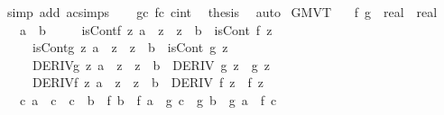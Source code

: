 \begin{isabellebody}
\ {\isacharparenleft}{\kern0pt}simp\ add{\isacharcolon}{\kern0pt}\ ac{\isacharunderscore}{\kern0pt}simps{\isacharparenright}{\kern0pt}\isanewline
\ \ \isamarkupfalse%
\ g{\isacharprime}{\kern0pt}c\ f{\isacharprime}{\kern0pt}c\ cint\ \isamarkupfalse%
\ {\isacharquery}{\kern0pt}thesis\ \isamarkupfalse%
\ auto\isanewline
{}\isamarkupfalse%
%
\endisatagproof
{\isafoldproof}%
%
\isadelimproof
\isanewline
%
\endisadelimproof
\isanewline
{}\isamarkupfalse%
\ GMVT{\isacharprime}{\kern0pt}{\isacharcolon}{\kern0pt}\isanewline
\ \ \ f\ g\ {\isacharcolon}{\kern0pt}{\isacharcolon}{\kern0pt}\ {\isachardoublequoteopen}real\ {\isasymRightarrow}\ real{\isachardoublequoteclose}\isanewline
\ \ \ {\isachardoublequoteopen}a\ {\isacharless}{\kern0pt}\ b{\isachardoublequoteclose}\isanewline
\ \ \ \ \ isCont{\isacharunderscore}{\kern0pt}f{\isacharcolon}{\kern0pt}\ {\isachardoublequoteopen}{\isasymAnd}z{\isachardot}{\kern0pt}\ a\ {\isasymle}\ z\ {\isasymLongrightarrow}\ z\ {\isasymle}\ b\ {\isasymLongrightarrow}\ isCont\ f\ z{\isachardoublequoteclose}\isanewline
\ \ \ \ \ isCont{\isacharunderscore}{\kern0pt}g{\isacharcolon}{\kern0pt}\ {\isachardoublequoteopen}{\isasymAnd}z{\isachardot}{\kern0pt}\ a\ {\isasymle}\ z\ {\isasymLongrightarrow}\ z\ {\isasymle}\ b\ {\isasymLongrightarrow}\ isCont\ g\ z{\isachardoublequoteclose}\isanewline
\ \ \ \ \ DERIV{\isacharunderscore}{\kern0pt}g{\isacharcolon}{\kern0pt}\ {\isachardoublequoteopen}{\isasymAnd}z{\isachardot}{\kern0pt}\ a\ {\isacharless}{\kern0pt}\ z\ {\isasymLongrightarrow}\ z\ {\isacharless}{\kern0pt}\ b\ {\isasymLongrightarrow}\ DERIV\ g\ z\ {\isacharcolon}{\kern0pt}{\isachargreater}{\kern0pt}\ {\isacharparenleft}{\kern0pt}g{\isacharprime}{\kern0pt}\ z{\isacharparenright}{\kern0pt}{\isachardoublequoteclose}\isanewline
\ \ \ \ \ DERIV{\isacharunderscore}{\kern0pt}f{\isacharcolon}{\kern0pt}\ {\isachardoublequoteopen}{\isasymAnd}z{\isachardot}{\kern0pt}\ a\ {\isacharless}{\kern0pt}\ z\ {\isasymLongrightarrow}\ z\ {\isacharless}{\kern0pt}\ b\ {\isasymLongrightarrow}\ DERIV\ f\ z\ {\isacharcolon}{\kern0pt}{\isachargreater}{\kern0pt}\ {\isacharparenleft}{\kern0pt}f{\isacharprime}{\kern0pt}\ z{\isacharparenright}{\kern0pt}{\isachardoublequoteclose}\isanewline
\ \ \ {\isachardoublequoteopen}{\isasymexists}c{\isachardot}{\kern0pt}\ a\ {\isacharless}{\kern0pt}\ c\ {\isasymand}\ c\ {\isacharless}{\kern0pt}\ b\ {\isasymand}\ {\isacharparenleft}{\kern0pt}f\ b\ {\isacharminus}{\kern0pt}\ f\ a{\isacharparenright}{\kern0pt}\ {\isacharasterisk}{\kern0pt}\ g{\isacharprime}{\kern0pt}\ c\ {\isacharequal}{\kern0pt}\ {\isacharparenleft}{\kern0pt}g\ b\ {\isacharminus}{\kern0pt}\ g\ a{\isacharparenright}{\kern0pt}\ {\isacharasterisk}{\kern0pt}\ f{\isacharprime}{\kern0pt}\ c{\isachardoublequoteclose}\isanewline

\end{isabellebody}
